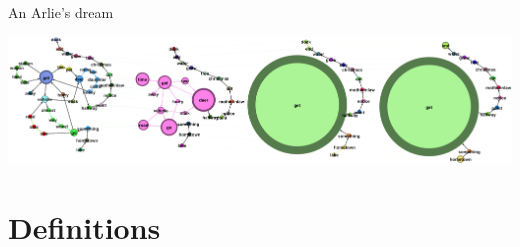 \documentclass[xcolor=x11names,compress]{beamer}
\begin{document}
{
    \begin{frame}[t]{An Arlie's dream}
        \vspace{-0.2cm}
        
        
        
        
        \begin{minipage}[t]{\textwidth}
            \hspace{-0.7cm}
            \includegraphics[width=1.1\textwidth]{immagini/arlie_80_ml}
        \end{minipage}
    \end{frame}}

\section{Definitions}
\end{document}
